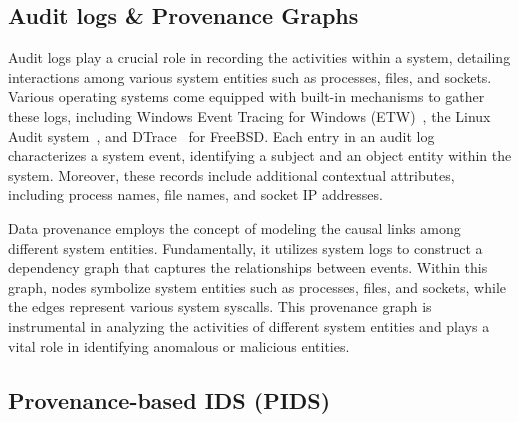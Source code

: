 
\subsection{Audit logs \& Provenance Graphs}

Audit logs play a crucial role in recording the activities within a system, detailing interactions among various system entities such as processes, files, and sockets. Various operating systems come equipped with built-in mechanisms to gather these logs, including Windows Event Tracing for Windows (ETW)~\cite{windowsaudit}, the Linux Audit system~\cite{linuxaudit}, and DTrace~\cite{dtrace} for FreeBSD. Each entry in an audit log characterizes a system event, identifying a subject and an object entity within the system. Moreover, these records include additional contextual attributes, including process names, file names, and socket IP addresses.

Data provenance employs the concept of modeling the causal links among different system entities. Fundamentally, it utilizes system logs to construct a dependency graph that captures the relationships between events. Within this graph, nodes symbolize system entities such as processes, files, and sockets, while the edges represent various system syscalls. This provenance graph is instrumental in analyzing the activities of different system entities and plays a vital role in identifying anomalous or malicious entities.



\subsection{Provenance-based IDS (PIDS)}

